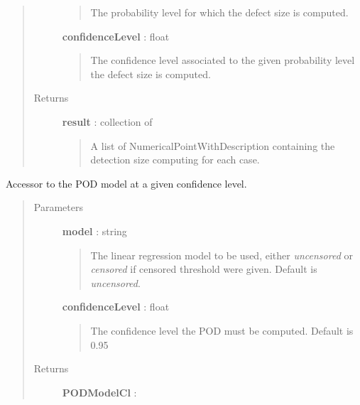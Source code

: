 \documentclass[letterpaper,10pt,english]{sphinxmanual}
\begin{document}
\begin{fulllineitems}
\begin{fulllineitems}
\begin{quote}
\begin{description}
\begin{quote}
The probability level for which the defect size is computed.
\end{quote}

\textbf{confidenceLevel} : float
\begin{quote}

The confidence level associated to the given probability level the
defect size is computed.
\end{quote}

\item[{Returns}] \leavevmode
\textbf{result} : collection of \href{http://doc.openturns.org/openturns-latest/sphinx/user\_manual/\_generated/openturns.NumericalPointWithDescription.html\#openturns.NumericalPointWithDescription}{}
\begin{quote}

A list of NumericalPointWithDescription containing the detection size
computing for each case.
\end{quote}

\end{description}\end{quote}

\end{fulllineitems}


\begin{fulllineitems}
\label{_generated/otpod.UnivariateLinearModelPOD:otpod.UnivariateLinearModelPOD.getPODCLModel}
Accessor to the POD model at a given confidence level.
\begin{quote}\begin{description}
\item[{Parameters}] \leavevmode
\textbf{model} : string
\begin{quote}

The linear regression model to be used, either \emph{uncensored} or
\emph{censored} if censored threshold were given. Default is \emph{uncensored}.
\end{quote}

\textbf{confidenceLevel} : float
\begin{quote}

The confidence level the POD must be computed. Default is 0.95
\end{quote}

\item[{Returns}] \leavevmode
\textbf{PODModelCl} : \href{http://doc.openturns.org/openturns-latest/sphinx/user\_manual/\_generated/openturns.NumericalMathFunction.html\#openturns.NumericalMathFunction}{}
\begin{quote}


\end{quote}
\end{description}
\end{quote}
\end{fulllineitems}
\end{fulllineitems}
\end{document}
